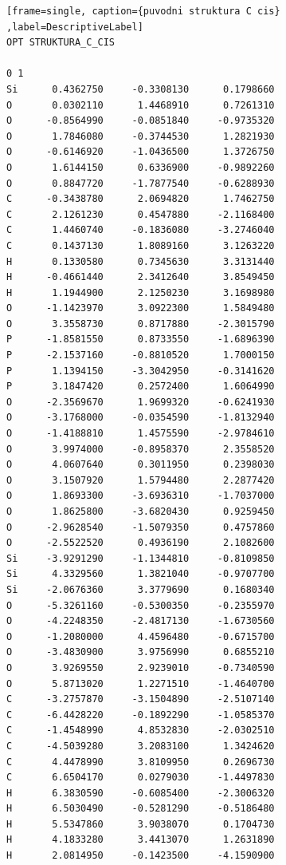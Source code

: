 \documentclass[
digital, %
table,   %
lof,     %
lot,     %
oneside,
]{fithesis3}
\begin{document}
\newpage

\begin{lstlisting}[frame=single, caption={puvodni struktura C cis} ,label=DescriptiveLabel]
OPT STRUKTURA_C_CIS

0 1
Si      0.4362750     -0.3308130      0.1798660
O       0.0302110      1.4468910      0.7261310
O      -0.8564990     -0.0851840     -0.9735320
O       1.7846080     -0.3744530      1.2821930
O      -0.6146920     -1.0436500      1.3726750
O       1.6144150      0.6336900     -0.9892260
O       0.8847720     -1.7877540     -0.6288930
C      -0.3438780      2.0694820      1.7462750
C       2.1261230      0.4547880     -2.1168400
C       1.4460740     -0.1836080     -3.2746040
C       0.1437130      1.8089160      3.1263220
H       0.1330580      0.7345630      3.3131440
H      -0.4661440      2.3412640      3.8549450
H       1.1944900      2.1250230      3.1698980
O      -1.1423970      3.0922300      1.5849480
O       3.3558730      0.8717880     -2.3015790
P      -1.8581550      0.8733550     -1.6896390
P      -2.1537160     -0.8810520      1.7000150
P       1.1394150     -3.3042950     -0.3141620
P       3.1847420      0.2572400      1.6064990
O      -2.3569670      1.9699320     -0.6241930
O      -3.1768000     -0.0354590     -1.8132940
O      -1.4188810      1.4575590     -2.9784610
O       3.9974000     -0.8958370      2.3558520
O       4.0607640      0.3011950      0.2398030
O       3.1507920      1.5794480      2.2877420
O       1.8693300     -3.6936310     -1.7037000
O       1.8625800     -3.6820430      0.9259450
O      -2.9628540     -1.5079350      0.4757860
O      -2.5522520      0.4936190      2.1082600
Si     -3.9291290     -1.1344810     -0.8109850
Si      4.3329560      1.3821040     -0.9707700
Si     -2.0676360      3.3779690      0.1680340
O      -5.3261160     -0.5300350     -0.2355970
O      -4.2248350     -2.4817130     -1.6730560
O      -1.2080000      4.4596480     -0.6715700
O      -3.4830900      3.9756990      0.6855210
O       3.9269550      2.9239010     -0.7340590
O       5.8713020      1.2271510     -1.4640700
C      -3.2757870     -3.1504890     -2.5107140
C      -6.4428220     -0.1892290     -1.0585370
C      -1.4548990      4.8532830     -2.0302510
C      -4.5039280      3.2083100      1.3424620
C       4.4478990      3.8109950      0.2696730
C       6.6504170      0.0279030     -1.4497830
H       6.3830590     -0.6085400     -2.3006320
H       6.5030490     -0.5281290     -0.5186480
H       5.5347860      3.9038070      0.1704730
H       4.1833280      3.4413070      1.2631890
H       2.0814950     -0.1423500     -4.1590900

\end{lstlisting}
\end{document}
